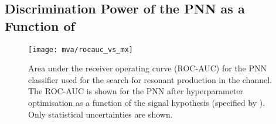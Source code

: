 \clearpage
\subsection{Discrimination Power of the PNN as a Function of \mX}%
\label{app:pnn_rocauc_vs_mx}

\begin{figure}[htbp]
  \centering

  \texttt{[image: mva/rocauc\_vs\_mx]}

  \caption{Area under the receiver operating curve (ROC-AUC) for the
    PNN classifier used for the search for resonant \HH production in
    the \hadhad channel. The ROC-AUC is shown for the PNN after
    hyperparameter optimisation as a function of the signal hypothesis
    (specified by \mX). Only statistical uncertainties are shown.}%
  \label{fig:pnn_rocauc_vs_mx}
\end{figure}


